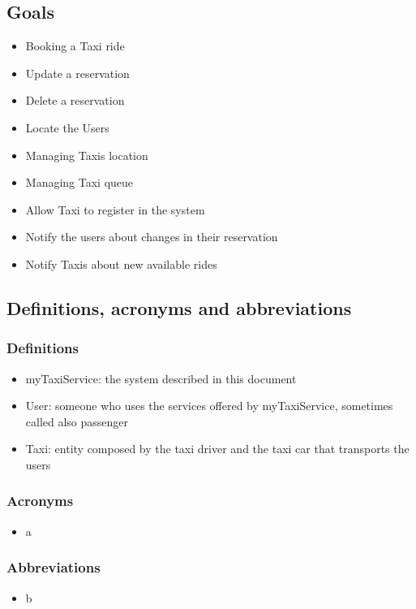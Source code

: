 	\subsection{Goals}
	\begin{itemize}
		\item Booking a Taxi ride
		\item Update a reservation
		\item Delete a reservation
		\item Locate the Users
		\item Managing Taxis location
		\item Managing Taxi queue
		\item Allow Taxi to register in the system
		\item Notify the users about changes in their reservation
		\item Notify Taxis about new available rides
	\end{itemize}
	
	\subsection{Definitions, acronyms and abbreviations}
		\subsubsection{Definitions}
		\begin{itemize}
			\item myTaxiService: the system described in this document
			\item User: someone who uses the services offered by myTaxiService, sometimes called also passenger
			\item Taxi: entity composed by the taxi driver and the taxi car that transports the users
		\end{itemize}
		\subsubsection{Acronyms}
		\begin{itemize}
			\item a
		\end{itemize}
		\subsubsection{Abbreviations}
		\begin{itemize}
			\item b
		\end{itemize}
